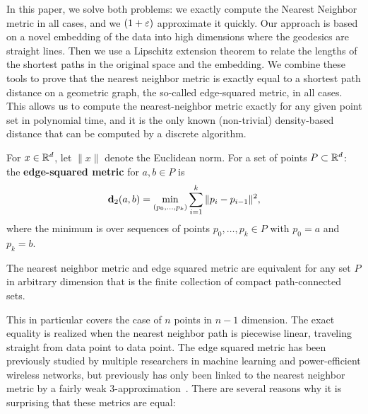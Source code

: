 In this paper, we solve both problems: we exactly compute the Nearest
Neighbor metric in all cases, and we $(1+\varepsilon)$ approximate it quickly.
Our approach is based on a novel embedding of the data into high dimensions where the geodesics are straight lines.
Then we use a Lipschitz extension theorem to relate the lengths of the shortest paths in the original space and the embedding.
We combine these tools to prove that the nearest neighbor metric is exactly equal to a shortest path distance on a geometric graph, the so-called edge-squared metric, in all cases.
This allows us to compute the nearest-neighbor metric exactly for any given point set in polynomial time, and it is the only known (non-trivial) density-based distance that can be computed by a discrete algorithm.

  \begin{definition}
For $x\in \mathbb{R}^d$, let $\|x\|$ denote the Euclidean norm.
  For a set of points $P\subset \mathbb{R}^d$:
  the \textbf{edge-squared metric} for $a,b\in P$ is
  \[
    \mathbf{d}_2(a,b) = \min_{(p_0,\ldots, p_k)}\sum_{i=1}^k \|p_i - p_{i-1}\|^2,
  \]
  where the minimum is over sequences of points $p_0,\ldots, p_k\in P$ with $p_0 = a$ and $p_k = b$.
  \end{definition}

\begin{theorem}\label{thm:NN} The nearest neighbor metric and edge squared
metric are equivalent for any set $P$ in arbitrary dimension that is the
finite collection of compact path-connected sets.
\end{theorem}

This in particular covers the case of $n$ points in $n-1$ dimension. The exact equality is realized when the nearest neighbor path is piecewise
linear, traveling straight from data point to data point.
The edge squared metric has been previously studied by multiple researchers
in machine learning and power-efficient wireless networks, but previously
has only been linked to the nearest neighbor metric by a fairly weak
3-approximation~\cite{cohen15approximating}.
There are several reasons why it is surprising that these metrics are equal:

